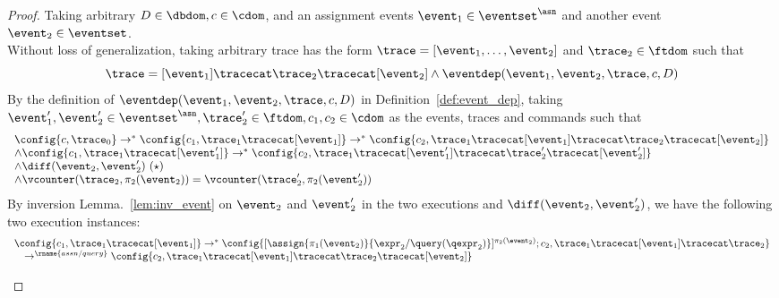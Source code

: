 \begin{proof}
Taking arbitrary $D \in \dbdom , c \in \cdom$, and an assignment events $\event_1 \in \eventset^{\asn}$ and another event 
$\event_2\in \eventset$.
\\
Without loss of generalization, 
taking arbitrary trace has the form $\trace = [\event_1, \ldots, \event_2]$ 
 and $\trace_2 \in \ftdom$ such that
 \[
	\trace = [\event_1] \tracecat \trace_2 \tracecat [\event_2]
	\land
	\eventdep(\event_1, \event_2, \trace, c, D)
	\]
%
By the definition of $\eventdep(\event_1, \event_2, \trace, c, D)$ in Definition~\ref{def:event_dep}, 
taking $ \event_1', \event_2' \in \eventset^{\asn},
\trace_2' \in \ftdom, c_1, c_2 \in \cdom$ as the events, traces and commands
such that
%
\[
\begin{array}{l}
\config{c, \trace_0} \rightarrow^{*}
\config{c_1, \trace_1 \tracecat [\event_1]} \rightarrow^{*} \config{c_2, \trace_1 \tracecat [\event_1] \tracecat \trace_2 \tracecat [\event_2]} 
\\ \land
\config{c_1, \trace_1 \tracecat [\event_1']} \rightarrow^{*} \config{c_2, \trace_1 \tracecat [\event_1'] \tracecat \trace_2' \tracecat [\event_2']} 
\\
\land \diff(\event_2,\event_2' ) ~(\star) 
\\
\land 
    \vcounter(\trace_2, \pi_2(\event_2))
    = 
    \vcounter(\trace_2', \pi_2(\event_2'))
\end{array}
\]
%
%
By inversion Lemma.~\ref{lem:inv_event} on $\event_2$ and $\event_2'$ in the two executions
and $\diff(\event_2, \event_2')$,
 we have the following two execution instances:
\[
	\begin{array}{l}
		\config{c_1, \trace_1 \tracecat [\event_1]} \rightarrow^{*} \config{[\assign{\pi_1(\event_2)}{\expr_2 / \query(\qexpr_2)}]{}^{\pi_2(\event_2)};c_2, \trace_1 \tracecat [\event_1] \tracecat \trace_2} 
		\\ \quad
		\rightarrow^\rname{assn / query} \config{c_2, \trace_1 \tracecat [\event_1] \tracecat \trace_2 \tracecat [\event_2]}  
	\end{array}
	\]
%
\[
	\begin{array}{l}

\end{array}\]
\end{proof}

